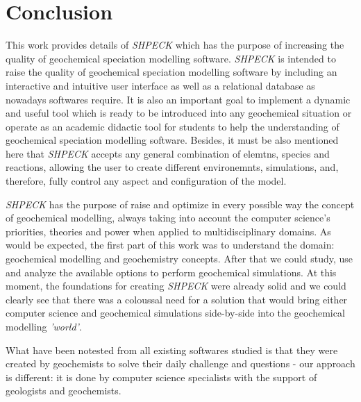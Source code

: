 
\chapter{Conclusion}
\label{chapter:conclusion}

This work provides details of \emph{SHPECK} which has the purpose of increasing the quality of geochemical speciation modelling software. \emph{SHPECK} is intended to raise the quality of geochemical speciation modelling software by including an interactive and intuitive user interface as well as a relational database as nowadays softwares require. It is also an important goal to implement a dynamic and useful tool which is ready to be introduced into any geochemical situation or operate as an academic didactic tool for students to help the understanding of geochemical speciation modelling software. Besides, it must be also mentioned here that \emph{SHPECK} accepts any general combination of elemtns, species and reactions, allowing the user to create different environemnts, simulations, and, therefore,  fully control any aspect and configuration of the model.

\emph{SHPECK} has the purpose of raise and optimize in every possible way the concept of geochemical modelling, always taking into account the computer science's priorities, theories and power when applied to multidisciplinary domains. As would be expected, the first part of this work was to understand the domain: geochemical modelling and geochemistry concepts. After that we could study, use and analyze the available options to perform geochemical simulations. At this moment, the foundations for creating \emph{SHPECK} were already solid and we could clearly see that there was a coloussal need for a solution that would bring either computer science and geochemical simulations side-by-side into the geochemical modelling \emph{'world'}.

What have been notested from all existing softwares studied is that they were created by geochemists to solve their daily challenge and questions - our approach is different: it is done by computer science specialists with the support of geologists and geochemists.

